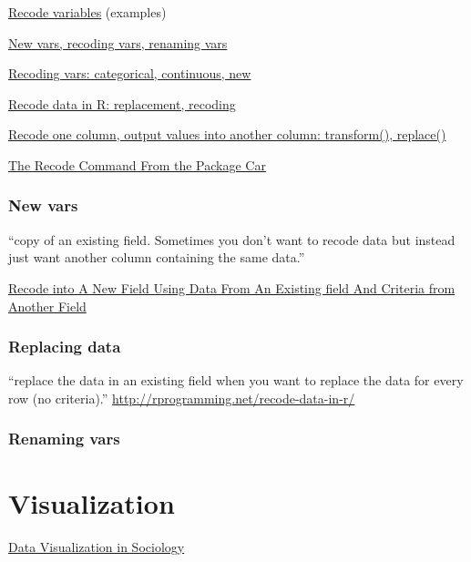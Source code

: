 \documentclass[reqno,12pt]{tufte-book}
\numberwithin{equation}{subsection}
\begin{document}
\href{http://www.uni-kiel.de/psychologie/rexrepos/posts/recode.html}{Recode variables} (examples)

\href{http://www.statmethods.net/management/variables.html}{New vars, recoding vars, renaming vars}

\href{http://www.cookbook-r.com/Manipulating\_data/Recoding\_data/}{Recoding vars: categorical, continuous, new}

\href{http://rprogramming.net/recode-data-in-r/}{Recode data in R: replacement, recoding}

\href{http://rwiki.sciviews.org/doku.php?id=tips:data-frames:recode_column}{Recode one column, output values into another column: transform(), replace()}

\href{http://rprogramming.net/recode-data-in-r/}{The Recode Command From the Package Car}

\section{New vars}
\label{sect:newvars}

``copy of an existing field. Sometimes you don’t want to recode data but instead just want another column containing the same data.''

\href{http://rprogramming.net/recode-data-in-r/}{Recode into A New Field Using Data From An Existing field And Criteria from Another Field}

\section{Replacing data}
\label{sect:datareplacement}

``replace the data in an existing field when you want to replace the data for every row (no criteria).'' \url{http://rprogramming.net/recode-data-in-r/}

\section{Renaming vars}
\label{sect:renamingvars}


\part{Visualization}

\href {http://kieranhealy.org/files/papers/data-visualization.pdf}{Data Visualization in Sociology}
\end{document}
